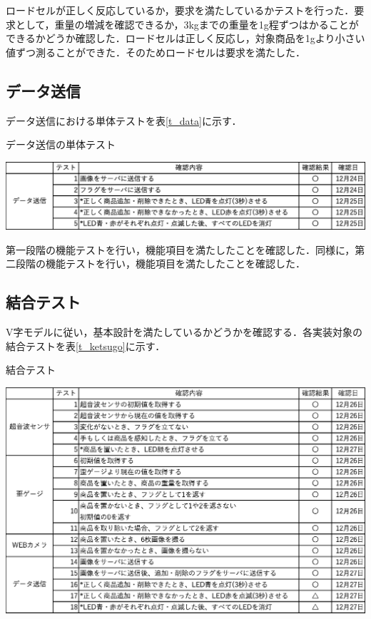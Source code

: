 ロードセルが正しく反応しているか，要求を満たしているかテストを行った．要求として，重量の増減を確認できるか，3kgまでの重量を1g程ずつはかることができるかどうか確認した．ロードセルは正しく反応し，対象商品を1gより小さい値ずつ測ることができた．そのためロードセルは要求を満たした．


\subsection*{データ送信}

データ送信における単体テストを表\ref{t_data}に示す．


\begin{table}[htbp]
\centering
\caption{データ送信の単体テスト}
\includegraphics[width = 15cm]{./picture/tantai_data.eps}
\label{t_data}
\end{table}

第一段階の機能テストを行い，機能項目を満たしたことを確認した．同様に，第二段階の機能テストを行い，機能項目を満たしたことを確認した．


\subsection{結合テスト}


V字モデルに従い，基本設計を満たしているかどうかを確認する．各実装対象の結合テストを表\ref{t_ketsugo}に示す．


\begin{table}[htbp]
\centering
\caption{結合テスト}
\includegraphics[width = 15cm]{./picture/t_ketsugo.eps}
\label{t_ketsugo}
\end{table}

